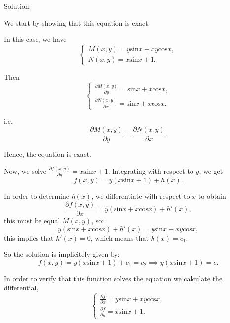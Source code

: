 \documentclass{article}
\begin{document}
		Solution:
		
		We start by showing that this equation is exact.

		In this case, we have   
		\begin{equation*}
			\begin{cases}
				M(x,y) = y\text{sin}x + xy\text{cos}x,
				\\
				N(x,y) = x\text{sin}x + 1.
			\end{cases}
		\end{equation*}
	
		Then
		\begin{equation*}
			\begin{cases}
				\frac{\partial M(x,y)}{\partial y} = \text{sin}x + x\text{cos}x,
				\\
				\frac{\partial N(x,y)}{\partial x} = \text{sin}x + x\text{cos}x.
			\end{cases}
		\end{equation*}
		
		
	
		i.e. \[ \frac{\partial M(x,y)}{\partial y} = \frac{\partial N(x,y)}{\partial x}.\]

		Hence, the equation is exact.

		Now, we solve $\frac{\partial f(x,y)}{\partial y} = x\text{sin}x + 1$. 
		Integrating with respect to $y$, we get
		\[f(x,y) = y(x\text{sin}x +1) + h(x).\]
		
		In order to determine $h(x)$, we differentiate with
		respect to $x$ to obtain
		\[\frac{\partial f(x,y)}{\partial x} = y(\text{sin}x+x\text{cos}x) + h'(x),\]
		this must be equal $M(x,y)$, so:
		\[y(\text{sin}x+x\text{cos}x) + h'(x) = y\text{sin}x + xy\text{cos}x,\]
		this implies that $h'(x)=0$, which means that $h(x) = c_1$.
		
		So the solution is implicitely given by:
		\[ f(x,y) = y(x\text{sin}x +1) + c_1 = c_2 \implies y(x\text{sin}x +1) = c.\]
		
		In order to verify that this function solves the equation we calculate the differential,
		\begin{equation*}
			\begin{cases}
				\frac{\partial f}{\partial x} = y\text{sin}x + xy\text{cos}x,
				\\
				\frac{\partial f}{\partial y} = x\text{sin}x + 1.
			\end{cases}
		\end{equation*}
\end{document}
